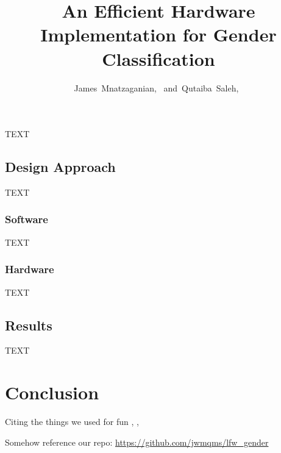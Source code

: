 \documentclass[10pt,journal]{IEEEtran}
\begin{document}
	
	\title{An Efficient Hardware Implementation for Gender Classification}
	
	\author{
		James~Mnatzaganian,~
        and~Qutaiba~Saleh,~%
	
		
	}
	
	

	\maketitle
	\IEEEdisplaynontitleabstractindextext
	
		TEXT
	
	\subsection{Design Approach}
		TEXT
		
		\subsubsection{Software}
			TEXT
		
		\subsubsection{Hardware}
			TEXT
	
	\subsection{Results}
		TEXT
	
	\section{Conclusion}
		Citing the things we used for fun \cite{lfw}, \cite{frontalize}, \cite{genderize}
		
		Somehow reference our repo: \url{https://github.com/jwmqms/lfw_gender}
	
	
		
	
\end{document}
